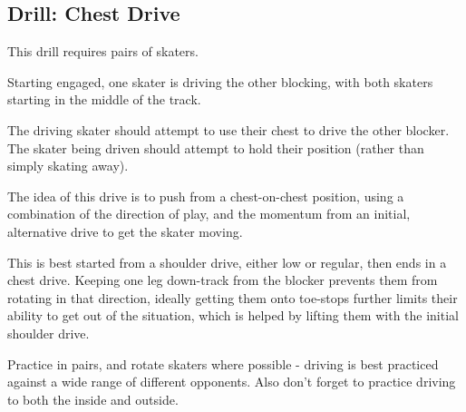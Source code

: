 \subsection*{Drill: Chest Drive}
\label{drill:drives/chest}

This drill requires pairs of skaters. 

Starting engaged, one skater is driving the other blocking, with both skaters starting in the middle of the track. 

The driving skater should attempt to use their chest to drive the other blocker.  
The skater being driven should attempt to hold their position (rather than simply skating away).

The idea of this drive is to push from a chest-on-chest position, using a combination of the direction of play, and the momentum from an initial, alternative drive to get the skater moving.     

This is best started from a shoulder drive, either low or regular, then ends in a chest drive. 
Keeping one leg down-track from the blocker prevents them from rotating in that direction, ideally getting them onto toe-stops further limits their ability to get out of the situation, which is helped by lifting them with the initial shoulder drive. 


Practice in pairs, and rotate skaters where possible - driving is best practiced against a wide range of different opponents.
Also don't forget to practice driving to both the inside and outside.


